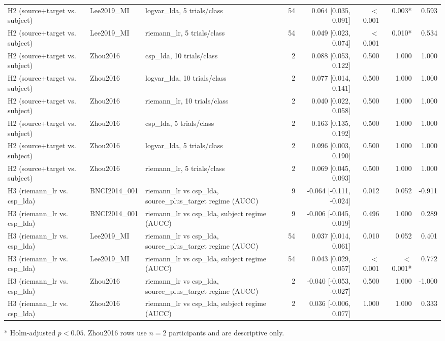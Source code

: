\begin{table}[t]
\begin{threeparttable}
\begin{tabularx}{\textwidth}{@{} l l X r r r r r @{}}
H2 (source+target vs. subject) & Lee2019\_MI & logvar\_lda, 5 trials/class & 54 & 0.064 [0.035, 0.091] & $<$0.001 & 0.003* & 0.593 \\
H2 (source+target vs. subject) & Lee2019\_MI & riemann\_lr, 5 trials/class & 54 & 0.049 [0.023, 0.074] & $<$0.001 & 0.010* & 0.534 \\
H2 (source+target vs. subject) & Zhou2016 & csp\_lda, 10 trials/class & 2 & 0.088 [0.053, 0.122] & 0.500 & 1.000 & 1.000 \\
H2 (source+target vs. subject) & Zhou2016 & logvar\_lda, 10 trials/class & 2 & 0.077 [0.014, 0.141] & 0.500 & 1.000 & 1.000 \\
H2 (source+target vs. subject) & Zhou2016 & riemann\_lr, 10 trials/class & 2 & 0.040 [0.022, 0.058] & 0.500 & 1.000 & 1.000 \\
H2 (source+target vs. subject) & Zhou2016 & csp\_lda, 5 trials/class & 2 & 0.163 [0.135, 0.192] & 0.500 & 1.000 & 1.000 \\
H2 (source+target vs. subject) & Zhou2016 & logvar\_lda, 5 trials/class & 2 & 0.096 [0.003, 0.190] & 0.500 & 1.000 & 1.000 \\
H2 (source+target vs. subject) & Zhou2016 & riemann\_lr, 5 trials/class & 2 & 0.069 [0.045, 0.093] & 0.500 & 1.000 & 1.000 \\
H3 (riemann\_lr vs. csp\_lda) & BNCI2014\_001 & riemann\_lr vs csp\_lda, source\_plus\_target regime (AUCC) & 9 & -0.064 [-0.111, -0.024] & 0.012 & 0.052 & -0.911 \\
H3 (riemann\_lr vs. csp\_lda) & BNCI2014\_001 & riemann\_lr vs csp\_lda, subject regime (AUCC) & 9 & -0.006 [-0.045, 0.019] & 0.496 & 1.000 & 0.289 \\
H3 (riemann\_lr vs. csp\_lda) & Lee2019\_MI & riemann\_lr vs csp\_lda, source\_plus\_target regime (AUCC) & 54 & 0.037 [0.014, 0.061] & 0.010 & 0.052 & 0.401 \\
H3 (riemann\_lr vs. csp\_lda) & Lee2019\_MI & riemann\_lr vs csp\_lda, subject regime (AUCC) & 54 & 0.043 [0.029, 0.057] & $<$0.001 & $<$0.001* & 0.772 \\
H3 (riemann\_lr vs. csp\_lda) & Zhou2016 & riemann\_lr vs csp\_lda, source\_plus\_target regime (AUCC) & 2 & -0.040 [-0.053, -0.027] & 0.500 & 1.000 & -1.000 \\
H3 (riemann\_lr vs. csp\_lda) & Zhou2016 & riemann\_lr vs csp\_lda, subject regime (AUCC) & 2 & 0.036 [-0.006, 0.077] & 1.000 & 1.000 & 0.333 \\
\bottomrule
\end{tabularx}
\begin{tablenotes}
\footnotesize
\item[*] Holm-adjusted $p < 0.05$. Zhou2016 rows use $n=2$ participants and are descriptive only.
\end{tablenotes}
\end{threeparttable}
\end{table}
